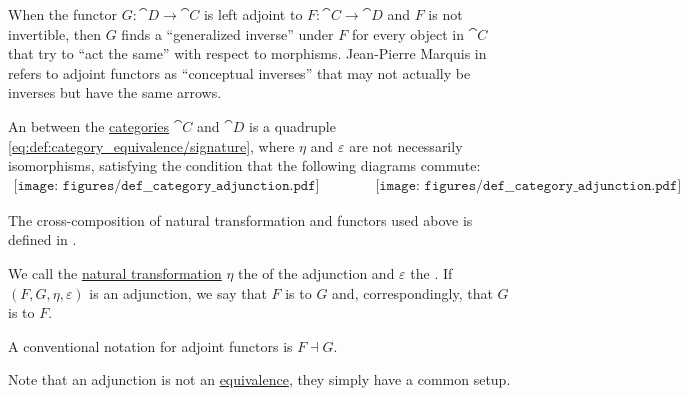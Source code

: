 \begin{definition}\label{def:category_adjunction}
  When the functor \( G: \cat{D} \to \cat{C} \) is left adjoint to \( F: \cat{C} \to \cat{D} \) and \( F \) is not invertible, then \( G \) finds a \enquote{generalized inverse} under \( F \) for every object in \( \cat{C} \) that try to \enquote{act the same} with respect to morphisms. Jean-Pierre Marquis in \cite{StanfordPlato:category_theory} refers to adjoint functors as \enquote{conceptual inverses} that may not actually be inverses but have the same arrows.

  An  between the \hyperref[def:category]{categories} \( \cat{C} \) and \( \cat{D} \) is a quadruple \eqref{eq:def:category_equivalence/signature}, where \( \eta \) and \( \varepsilon \) are not necessarily isomorphisms, satisfying the condition that the following diagrams commute:
  \begin{equation}\label{eq:def:category_adjunction/diagrams}
    \begin{aligned}
      \texttt{[image: figures/def\_\_category\_adjunction.pdf]}
      \quad\quad\quad\quad
      \texttt{[image: figures/def\_\_category\_adjunction.pdf]}
    \end{aligned}
  \end{equation}

  The cross-composition of natural transformation and functors used above is defined in .

  We call the \hyperref[def:natural_transformation]{natural transformation} \( \eta \) the  of the adjunction and \( \varepsilon \) the . If \( (F, G, \eta, \varepsilon) \) is an adjunction, we say that \( F \) is  to \( G \) and, correspondingly, that \( G \) is  to \( F \).

  A conventional notation for adjoint functors is \( F \dashv G \).

  Note that an adjunction is not an \hyperref[def:category_equivalence]{equivalence}, they simply have a common setup.
\end{definition}
